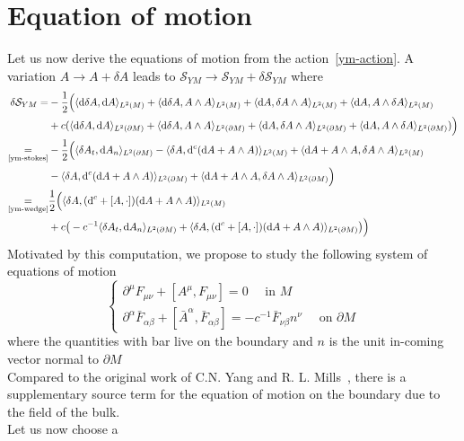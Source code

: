 \section{Equation of motion}
Let us now derive the equations of motion from the action~\cref{ym-action}.
A variation $A \rightarrow A + \delta A$ leads to $\mathcal{S}_{YM} \rightarrow \mathcal{S}_{YM} + \delta\mathcal{S}_{YM}$ where
%
\begin{equation*}
\begin{split}
\delta \mathcal S_{YM} = & -\frac 1 2 \Big(
 \langle \dd \delta A, \dd A \rangle_{L^2(M)} + 
 \langle \dd \delta A , A\wedge A \rangle_{L^2(M)} + 
 \langle \dd A , \delta A\wedge A \rangle_{L^2(M)} + 
 \langle \dd A , A\wedge \delta A \rangle_{L^2(M)}  \\ & + 
 c (\langle \dd \delta A, \dd A \rangle_{L^2(\partial M)}+
 \langle \dd \delta A , A\wedge A \rangle_{L^2(\partial M)} + 
 \langle \dd A , \delta A\wedge A \rangle_{L^2(\partial M)} + 
 \langle \dd A , A\wedge \delta A \rangle_{L^2(\partial M)}  
 )
 \Big) \\
 \underset{\textrm{\cref{ym-stokes}}}{=} & - \frac{1}{2} \Big(
 \langle \delta A_t, \dd A_n \rangle_{L^2(\partial M)} -
 \langle \delta A, \dd^c (\dd A + A\wedge A) \rangle_{L^2(M)} + 
 \langle \dd A + A \wedge A, \delta A \wedge A \rangle_{L^2(M)} \\ & -
 \langle \delta A, \dd^c (\dd A + A\wedge A) \rangle_{L^2(\partial M)} + 
 \langle \dd A + A \wedge A, \delta A \wedge A \rangle_{L^2(\partial M)}
 \Big) \\
\underset{\textrm{\cref{ym-wedge}}}{=} & \frac 1 2 \Big(
\langle \delta A, (\dd^c + [A, \cdot ])(\dd A+ A \wedge A) \rangle_{L^2(M)} \\ &+
c \big(- c^{-1}\langle \delta A_t, \dd A_n \rangle_{L^2(\partial M)} +
\langle \delta A, (\dd^c + [A, \cdot ])(\dd A+ A \wedge A) \rangle_{L^2(\partial M)} \big)
\Big)
\end{split}
\end{equation*}
Motivated by this computation, we propose to study the following system of equations of motion
\begin{equation}\label{ym-motion1}
\begin{cases}
\partial^\mu F_{\mu\nu} + [A^\mu, F_{\mu\nu}] = 0 \quad\textrm{ in $M$}\\
%
\partial^\alpha \bar F_{\alpha\beta} + [\bar A^\alpha, \bar F_{\alpha\beta}] =  
 -c^{-1} \bar F_{\nu\beta} n^\nu
\quad\textrm{ on $\partial M$}
\end{cases}
\end{equation}
where the quantities with bar live on the boundary and $n$ is the unit in-coming vector normal to $\partial M$\\
Compared to the original work of C.N. Yang and R. L. Mills~\cite{Yang1954}, there is a supplementary source term for the equation of motion on the boundary due to the field of the bulk.\\
Let us now choose a 








